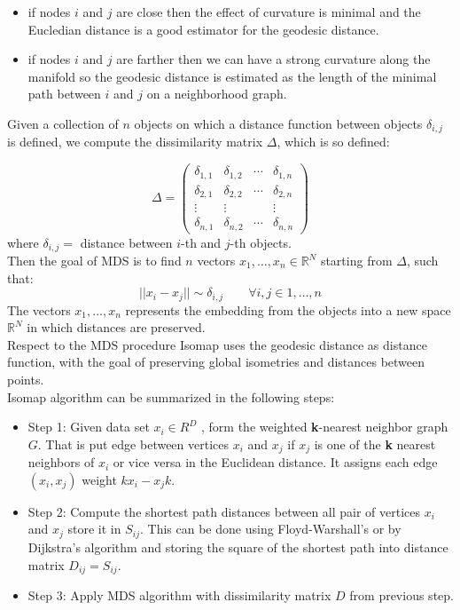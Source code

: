 \documentclass[11pt,a4paper]{article}
\begin{document}
\begin{itemize}
	\item if nodes $i$ and $j$ are close then the effect of curvature is minimal and the Eucledian distance is a good estimator for the geodesic distance.
	\item if nodes $i$ and $j$ are farther then we can have a strong curvature along the manifold so the geodesic distance is estimated as the length of the minimal path between $i$ and $j$ on a neighborhood graph.
\end{itemize}
Given a collection of $n$ objects on which a distance function between objects $\delta_{i,j}$ is defined, we compute the dissimilarity matrix $\Delta$, which is so defined: 

$$\Delta = 
\begin{pmatrix}
	\delta_{1,1} & \delta_{1,2} & \cdots & \delta_{1,n} \\
	\delta_{2,1} & \delta_{2,2} & \cdots & \delta_{2,n} \\
	\vdots & \vdots & & \vdots \\
	\delta_{n,1} & \delta_{n,2} & \cdots & \delta_{n,n}
\end{pmatrix}
$$
where  $\delta_{i,j} =$ distance between $i$-th and $j$-th objects.\\
Then the goal of MDS is to find $n$ vectors $x_1,\dots,x_n \in \mathbb{R}^N$ starting from $\Delta$, such that:
$$ ||x_i - x_j|| \sim \delta_{i,j} \qquad \forall i,j \in 1,\dots,n$$
The vectors $x_1,\dots,x_n$ represents the embedding from the objects into a new space $\mathbb{R}^N$ in which distances are preserved.\\
Respect to the MDS procedure Isomap uses the geodesic distance as distance function, with the goal of preserving global isometries and distances between points.\\

Isomap algorithm can be summarized in the following steps:
\begin{itemize}
	\item Step 1: Given data set $x_i \in R^D$ , form the weighted \textbf{k}-nearest
	neighbor graph $G$. That is put edge between vertices $x_i$ and $x_j$ if $x_j$
	is one of the \textbf{k} nearest neighbors of $x_i$ or vice versa in the Euclidean
	distance. It assigns each edge $(x_i, x_j)$ weight $kx_i - x_jk$.
	\item Step 2: Compute the shortest path distances between all pair of vertices
	$x_i$ and $x_j$ store it in $S_{ij}$. This can be done using Floyd-Warshall's or by Dijkstra's algorithm and storing the square of the shortest path into distance matrix $D_{ij} = S_{ij}$.
	\item Step 3: Apply MDS algorithm with dissimilarity matrix $D$ from previous step.
\end{itemize}
\end{document}
